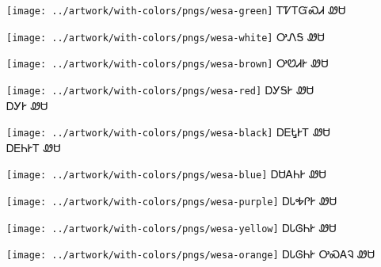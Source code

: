 \documentclass[avery5371]{flashcards}%
\begin{document}
\begin{flashcard}{
\texttt{[image: ../artwork/with-colors/pngs/wesa-green]}
}\Huge ᎢᏤᎢᏳᏍᏗ ᏪᏌ
\end{flashcard}

\begin{flashcard}{
\texttt{[image: ../artwork/with-colors/pngs/wesa-white]}
}\Huge ᎤᏁᎦ ᏪᏌ
\end{flashcard}

\begin{flashcard}{
\texttt{[image: ../artwork/with-colors/pngs/wesa-brown]}
}\Huge ᎤᏬᏗᎨ ᏪᏌ
\end{flashcard}

\begin{flashcard}{
\texttt{[image: ../artwork/with-colors/pngs/wesa-red]}
}\Huge ᎠᎩᎦᎨ ᏪᏌ\\ᎠᎩᎨ ᏪᏌ
\end{flashcard}

\begin{flashcard}{
\texttt{[image: ../artwork/with-colors/pngs/wesa-black]}
}\Huge ᎠᎬᎿᎨᎢ ᏪᏌ\\ᎠᎬᏂᎨᎢ ᏪᏌ
\end{flashcard}

\begin{flashcard}{
\texttt{[image: ../artwork/with-colors/pngs/wesa-blue]}
}\Huge ᎠᏌᎪᏂᎨ ᏪᏌ
\end{flashcard}

\begin{flashcard}{
\texttt{[image: ../artwork/with-colors/pngs/wesa-purple]}
}\Huge ᎠᏓᎭᎵᎨ ᏪᏌ
\end{flashcard}

\begin{flashcard}{
\texttt{[image: ../artwork/with-colors/pngs/wesa-yellow]}
}\Huge ᎠᏓᎶᏂᎨ ᏪᏌ
\end{flashcard}

\begin{flashcard}{
\texttt{[image: ../artwork/with-colors/pngs/wesa-orange]}
}\Huge ᎠᏓᎶᏂᎨ ᎤᏍᎪᎸ ᏪᏌ
\end{flashcard}
\end{document}

